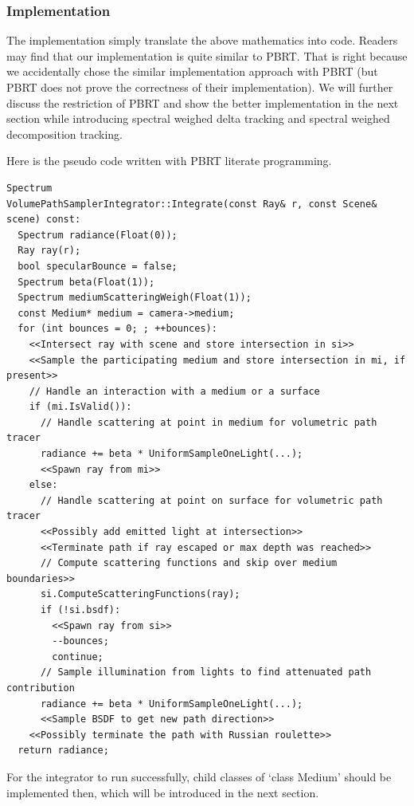 \documentclass[acmtog]{acmart}
\begin{document}
\subsubsection{Implementation}
    The implementation simply translate the above mathematics into code.
    Readers may find that our implementation is quite similar to PBRT.
    That is right because we accidentally chose the similar implementation approach with PBRT (but PBRT does not prove the correctness of their implementation).
    We will further discuss the restriction of PBRT and show the better implementation in the next section 
    while introducing spectral weighed delta tracking and spectral weighed decomposition tracking.\par
        Here is the pseudo code written with PBRT literate programming.
\lstset{basicstyle=\tiny\ttfamily}
\begin{lstlisting}
Spectrum
VolumePathSamplerIntegrator::Integrate(const Ray& r, const Scene& scene) const:
  Spectrum radiance(Float(0));
  Ray ray(r);
  bool specularBounce = false;
  Spectrum beta(Float(1));
  Spectrum mediumScatteringWeigh(Float(1));
  const Medium* medium = camera->medium;
  for (int bounces = 0; ; ++bounces):
    <<Intersect ray with scene and store intersection in si>>
    <<Sample the participating medium and store intersection in mi, if present>>
    // Handle an interaction with a medium or a surface
    if (mi.IsValid()):
      // Handle scattering at point in medium for volumetric path tracer
      radiance += beta * UniformSampleOneLight(...);
      <<Spawn ray from mi>>
    else:
      // Handle scattering at point on surface for volumetric path tracer
      <<Possibly add emitted light at intersection>>
      <<Terminate path if ray escaped or max depth was reached>>
      // Compute scattering functions and skip over medium boundaries>>
      si.ComputeScatteringFunctions(ray);
      if (!si.bsdf):
        <<Spawn ray from si>>
        --bounces;
        continue;
      // Sample illumination from lights to find attenuated path contribution
      radiance += beta * UniformSampleOneLight(...);
      <<Sample BSDF to get new path direction>>
    <<Possibly terminate the path with Russian roulette>>
  return radiance;
\end{lstlisting}
\lstset{basicstyle=\small\ttfamily}
    For the integrator to run successfully, child classes of `class Medium' should be implemented then, 
    which will be introduced in the next section.
\end{document}
